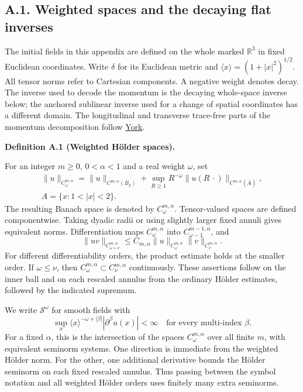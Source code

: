 \documentclass[
  english,
  11pt,
  reqno]{amsart}
\makeatletter
\newcommand{\pandocstatementheading}[1]{%
  \par\if@nobreak\else
    \addpenalty{\@beginparpenalty}%
    \addvspace{.5\baselineskip plus .2\baselineskip minus .2\baselineskip}%
  \fi
  {\normalfont\bfseries #1\par}%
  \nobreak\@afterindenttrue\@afterheading
}
\makeatother
\begin{document}
\subsection{A.1. Weighted spaces and the decaying flat
inverses}\label{a.1.-weighted-spaces-and-the-decaying-flat-inverses}\label{sec:online-weighted-chart-spaces}

The initial fields in this appendix are defined on the whole marked
\(\mathbb R^3\) in fixed Euclidean coordinates. Write \(\delta\) for its
Euclidean metric and \(\langle x\rangle=(1+|x|^2)^{1/2}\). All tensor
norms refer to Cartesian components. A negative weight denotes decay.
The inverse used to decode the momentum is the decaying whole-space
inverse below; the anchored sublinear inverse used for a change of
spatial coordinates has a different domain. The longitudinal and
transverse trace-free parts of the momentum decomposition follow
\hyperref[ref-York1974]{York}.

\pandocstatementheading{\leavevmode{}\label{def:online-weighted-holder-chart-spaces}Definition A.1 (Weighted Hölder spaces).}

For an integer \(m\ge0\), \(0<\alpha<1\) and a real weight \(\omega\),
set%
 \[
\begin{gathered}
\|u\|_{C^{m,\alpha}_\omega}
=\|u\|_{C^{m,\alpha}(B_2)}
+\sup_{R\ge1}R^{-\omega}
\|u(R\,\cdot)\|_{C^{m,\alpha}(\overline A)}, \\
A=\{x:1<|x|<2\}.
\end{gathered}
\] The resulting Banach space is denoted by \(C^{m,\alpha}_\omega\).
Tensor-valued spaces are defined componentwise. Taking dyadic radii or
using slightly larger fixed annuli gives equivalent norms.
Differentiation maps \(C^{m,\alpha}_\omega\) into
\(C^{m-1,\alpha}_{\omega-1}\), and%
 \[
\|uv\|_{C^{m,\alpha}_{\omega+\nu}}
\le C_{m,\alpha}\|u\|_{C^{m,\alpha}_\omega}
\|v\|_{C^{m,\alpha}_\nu}.
\] For different differentiability orders, the product estimate holds at
the smaller order. If \(\omega\le\nu\), then
\(C^{m,\alpha}_\omega\subset C^{m,\alpha}_\nu\) continuously. These
assertions follow on the inner ball and on each rescaled annulus from
the ordinary Hölder estimates, followed by the indicated supremum.

We write \(\mathscr S^\omega\) for smooth fields with \[
\sup_x\langle x\rangle^{-\omega+|\beta|}
|\partial^\beta u(x)|<\infty
\quad\text{for every multi-index }\beta.
\] For a fixed \(\alpha\), this is the intersection of the spaces
\(C^{m,\alpha}_\omega\) over all finite \(m\), with equivalent seminorm
systems. One direction is immediate from the weighted Hölder norm. For
the other, one additional derivative bounds the Hölder seminorm on each
fixed rescaled annulus. Thus passing between the symbol notation and all
weighted Hölder orders uses finitely many extra seminorms.
\end{document}
